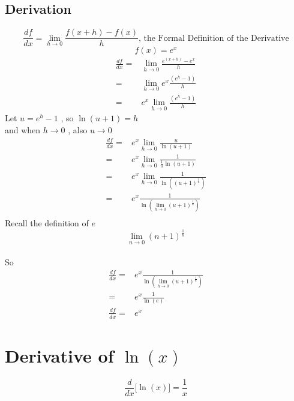 \subsection{Derivation}
\[\frac{df}{dx} = \lim_{h\to0}\frac{f(x+h) -f(x)}{h}  \text{, the Formal Definition of the Derivative} \]
\[ f(x) = e^x \]
\begin{align*}
\frac{df}{dx} =& \lim_{h\to0}\frac{e^{(x+h)} - e^x}{h} \\
=& \lim_{h\to0} e^x\frac{(e^h - 1)}{h} \\
=& e^x \lim_{h\to0} \frac{(e^h - 1)}{h}
\end{align*}
Let \( u = e^h -1 \) , so \(\ln{(u+1)} = h \) \\
and when \( h\to 0 \) , also  \(u \to 0\)
\begin{align*}
\frac{df}{dx} =& e^x \lim_{h\to0} \frac{u}{\ln{(u+1)}} \\
=& e^x \lim_{h\to0} \frac{1}{\frac{1}{u}\ln{(u+1)}} \\
=& e^x \lim_{h\to0} \frac{1}{\ln{\left((u+1)^{\frac{1}{u}}\right)}} \\
=& e^x  \frac{1}{\ln{\left(\lim_{h\to0}(u+1)^{\frac{1}{u}}\right)}} \\
\end{align*}
Recall the definition of \(e\)
\[\lim_{n\to0}(n+1)^{\frac{1}{n}}\]\\
So
\begin{align*}
\frac{df}{dx} =& e^x  \frac{1}{\ln{\left(\lim_{h\to0}(u+1)^{\frac{1}{u}}\right)}} \\
 =& e^x  \frac{1}{\ln{(e)}} \\
 \frac{df}{dx} =& e^x
\end{align*}

\section{Derivative of $\ln(x)$}
\[ \frac{d}{dx}\bigg[\ln(x) \bigg] = \frac{1}{x} \]

